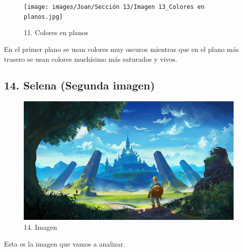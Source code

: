 \documentclass[12pt]{article}
\begin{document}
        \begin{figure}[H]
          \centering
          \texttt{[image: images/Joan/Sección 13/Imagen 13\_Colores en planos.jpg]}
          \caption{\small 11. Colores en planos}
        \end{figure}

        En el primer plano se usan colores muy oscuros mientras que en el plano más trasero se usan colores muchísimo más saturados y vivos. 

\newpage

\subsection{14. Selena (Segunda imagen)}
    \begin{figure}[H]
      \centering
      \includegraphics[width=\textwidth]{images/Selena/14_concept_art.jpg}
      \caption{\small 14. Imagen}
    \end{figure}

    Esta es la imagen que vamos a analizar.
\end{document}
